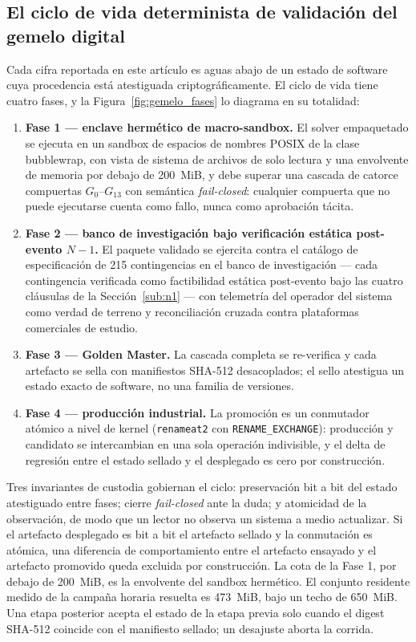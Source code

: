 \subsection{El ciclo de vida determinista de validación del gemelo digital}
\label{sub:lifecycle}

Cada cifra reportada en este artículo es aguas abajo de un estado de software cuya procedencia está atestiguada criptográficamente. El ciclo de vida tiene cuatro fases, y la Figura~\ref{fig:gemelo_fases} lo diagrama en su totalidad:
\begin{enumerate}
\item \textbf{Fase 1 --- enclave hermético de macro-sandbox.} El solver empaquetado se ejecuta en un sandbox de espacios de nombres POSIX de la clase bubblewrap, con vista de sistema de archivos de solo lectura y una envolvente de memoria por debajo de 200~MiB, y debe superar una cascada de catorce compuertas $G_0$--$G_{13}$ con semántica \emph{fail-closed}: cualquier compuerta que no puede ejecutarse cuenta como fallo, nunca como aprobación tácita.
\item \textbf{Fase 2 --- banco de investigación bajo verificación estática post-evento $N-1$.} El paquete validado se ejercita contra el catálogo de especificación de 215 contingencias en el banco de investigación --- cada contingencia verificada como factibilidad estática post-evento bajo las cuatro cláusulas de la Sección~\ref{sub:n1} --- con telemetría del operador del sistema como verdad de terreno y reconciliación cruzada contra plataformas comerciales de estudio.
\item \textbf{Fase 3 --- Golden Master.} La cascada completa se re-verifica y cada artefacto se sella con manifiestos SHA-512 desacoplados; el sello atestigua un estado exacto de software, no una familia de versiones.
\item \textbf{Fase 4 --- producción industrial.} La promoción es un conmutador atómico a nivel de kernel (\texttt{renameat2} con \texttt{RENAME\_EXCHANGE}): producción y candidato se intercambian en una sola operación indivisible, y el delta de regresión entre el estado sellado y el desplegado es cero por construcción.
\end{enumerate}

Tres invariantes de custodia gobiernan el ciclo: preservación bit a bit del estado atestiguado entre fases; cierre \emph{fail-closed} ante la duda; y atomicidad de la observación, de modo que un lector no observa un sistema a medio actualizar. Si el artefacto desplegado es bit a bit el artefacto sellado y la conmutación es atómica, una diferencia de comportamiento entre el artefacto ensayado y el artefacto promovido queda excluida por construcción. La cota de la Fase 1, por debajo de 200~MiB, es la envolvente del sandbox hermético. El conjunto residente medido de la campaña horaria resuelta es 473~MiB, bajo un techo de 650~MiB. Una etapa posterior acepta el estado de la etapa previa solo cuando el digest SHA-512 coincide con el manifiesto sellado; un desajuste aborta la corrida.


